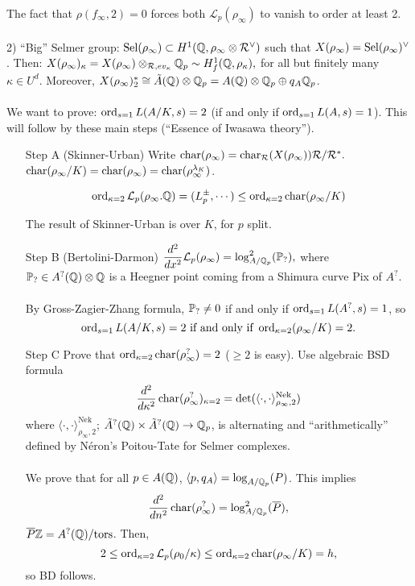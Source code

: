 \documentclass[12pt,amsfont]{amsart}
\begin{document}
The fact that $\rho(f_\infty, 2) = 0$ forces both $\mathcal{L}_p(\rho_\infty)$ to vanish to order at least 2. \\ \\
2) ``Big'' Selmer group: $\operatorname{Sel}(\rho_\infty) \subset H^1({\mathbb Q}, \rho_\infty \otimes \mathcal{R}^\vee)$ such that $X(\rho_\infty) = \operatorname{Sel}(\rho_\infty)^\vee$. Then: $X(\rho_\infty)_\kappa = X(\rho_\infty) \otimes_{\mathcal{R}, ev_\kappa} {\mathbb Q}_p \sim H_f^1({\mathbb Q}, \rho_\kappa),$ for all but finitely many $\kappa \in U^d$. Moreover, $X(\rho_\infty)_2^\ast \cong \tilde{A}({\mathbb Q}) \otimes {\mathbb Q}_p = A({\mathbb Q}) \otimes {\mathbb Q}_p \oplus q_A {\mathbb Q}_p$. \\ \\
We want to prove: $\operatorname{ord}_{s=1} L(A/K, s) = 2$ (if and only if $\operatorname{ord}_{s=1} L(A,s) = 1$). This will follow by these main steps (``Essence of Iwasawa theory''). 
\begin{enumerate}
\item[Step A]
(Skinner-Urban) Write $\operatorname{char}(\rho_\infty) = \operatorname{char}_{\mathcal{R}} (X(\rho_\infty)) \mathcal{R}/\mathcal{R}^\ast.$ $\operatorname{char}(\rho_\infty/K) = \operatorname{char}(\rho_\infty) = \operatorname{char}(\rho_\infty^{\lambda_K})$.

\[\operatorname{ord}_{\kappa = 2} \mathcal{L}_p(\rho_\infty.{\mathbb Q}) = (L_p^{\pm}, \cdots ) \leq \operatorname{ord}_{\kappa = 2} \operatorname{char}(\rho_\infty / K)\]

\begin{rmk} The result of Skinner-Urban is over $K$, for $p$ split. 
\end{rmk}
\item[Step B]
(Bertolini-Darmon) $\displaystyle \frac{d^2}{dx^2} \mathcal{L}_p(\rho_\infty) = \log_{A/{\mathbb Q}_p}^2 (\mathbb{P}_{?}),$ where $\mathbb{P}_{?} \in A^{?}({\mathbb Q}) \otimes {\mathbb Q}$ is a Heegner point coming from a Shimura curve Pix of $A^{?}$. \\ \\
By Gross-Zagier-Zhang formula, $\mathbb{P}_{?} \ne 0$ if and only if $\operatorname{ord}_{s=1} L(A^{?}, s) = 1$, so
\[\operatorname{ord}_{s=1} L(A/K,s) = 2 \text{ if and only if } \operatorname{ord}_{\kappa = 2} (\rho_\infty/K) = 2.\] 
\item[Step C] Prove that $\operatorname{ord}_{\kappa = 2} \operatorname{char}(\rho_\infty^{?}) = 2$ ($\geq 2$ is easy). Use algebraic BSD formula
\[\frac{d^2}{d\kappa^2} \operatorname{char}(\rho_\infty^{?})_{\kappa = 2} = \det(\langle \cdot, \cdot \rangle_{\rho_\infty, 2}^{\text{Nek}})\]
where $\langle \cdot, \cdot \rangle_{\rho_\infty, 2}^{\text{Nek}}$; $\tilde{A}^{?}({\mathbb Q}) \times \tilde{A}^{?}({\mathbb Q}) \rightarrow {\mathbb Q}_p$, is alternating and ``arithmetically'' defined by N\'{e}ron's Poitou-Tate for Selmer complexes. \\ \\
We prove that for all $p \in A({\mathbb Q})$, $\langle p, q_A\rangle = \log_{A/{\mathbb Q}_p} (P)$. This implies 
\[\frac{d^2}{dn^2} \operatorname{char}(\rho_\infty^{?}) = \log_{A/{\mathbb Q}_p}^2 (\overline{P}),\]
$\overline{P} {\mathbb Z} = A^{?}({\mathbb Q})/\text{tors}$. Then, 
\[2 \leq \operatorname{ord}_{\kappa = 2} \mathcal{L}_p(\rho_0/\kappa) \leq \operatorname{ord}_{\kappa = 2} \operatorname{char}(\rho_\infty/K) = h,\]
so BD follows. 
\end{enumerate}
\end{document}
